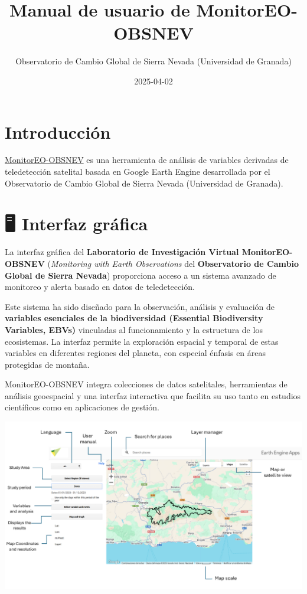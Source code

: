 \documentclass[
]{book}
\title{Manual de usuario de MonitorEO-OBSNEV}
\author{Observatorio de Cambio Global de Sierra Nevada (Universidad de Granada)}
\date{2025-04-02}
\begin{document}
\maketitle

{
\setcounter{tocdepth}{1}
\tableofcontents
}
\chapter{Introducción}\label{intro}

\href{https://sl.ugr.es/monitoreoobsnev}{MonitorEO-OBSNEV} es una herramienta de análisis de variables derivadas de teledetección satelital basada en Google Earth Engine desarrollada por el Observatorio de Cambio Global de Sierra Nevada (Universidad de Granada).

\chapter{🖥️ Interfaz gráfica}\label{interfaz}

La interfaz gráfica del \textbf{Laboratorio de Investigación Virtual MonitorEO-OBSNEV} (\emph{Monitoring with Earth Observations} del \textbf{Observatorio de Cambio Global de Sierra Nevada}) proporciona acceso a un sistema avanzado de monitoreo y alerta basado en datos de teledetección.

Este sistema ha sido diseñado para la observación, análisis y evaluación de \textbf{variables esenciales de la biodiversidad (Essential Biodiversity Variables, EBVs)} vinculadas al funcionamiento y la estructura de los ecosistemas. La interfaz permite la exploración espacial y temporal de estas variables en diferentes regiones del planeta, con especial énfasis en áreas protegidas de montaña.

MonitorEO-OBSNEV integra colecciones de datos satelitales, herramientas de análisis geoespacial y una interfaz interactiva que facilita su uso tanto en estudios científicos como en aplicaciones de gestión.

\includegraphics{assets/InterfazMonitorEO.png}
\end{document}
